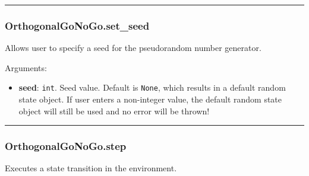 \begin{Shaded}
\begin{Highlighting}[]
\OperatorTok{=}
\end{Highlighting}
\end{Shaded}

\begin{center}\rule{0.5\linewidth}{\linethickness}\end{center}

\subsubsection{OrthogonalGoNoGo.set\_seed}\label{orthogonalgonogo.set_seed}

\begin{Shaded}
\begin{Highlighting}[]
\OperatorTok{=}\NormalTok{)}
\end{Highlighting}
\end{Shaded}

Allows user to specify a seed for the pseudorandom number generator.

Arguments:

\begin{itemize}
\tightlist
\item
  \textbf{seed}: \texttt{int}. Seed value. Default is \texttt{None},
  which results in a default random state object. If user enters a
  non-integer value, the default random state object will still be used
  and no error will be thrown!
\end{itemize}

\begin{center}\rule{0.5\linewidth}{\linethickness}\end{center}

\subsubsection{OrthogonalGoNoGo.step}\label{orthogonalgonogo.step}

\begin{Shaded}
\begin{Highlighting}[]
\end{Highlighting}
\end{Shaded}

Executes a state transition in the environment.

